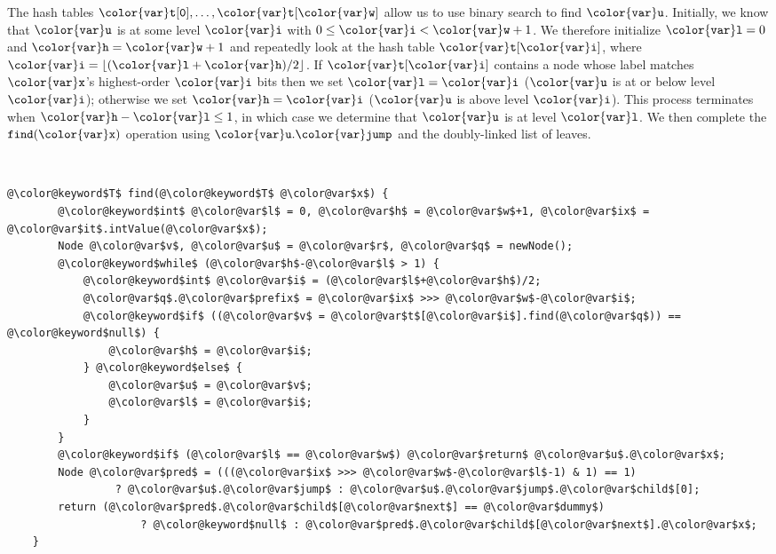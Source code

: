 \documentclass[10pt]{book}
\theoremstyle{plain}
\theoremstyle{definition}
\begin{document}
The hash tables $\ensuremath{\mathtt{{\color{var}t}[0]}},\ldots,\ensuremath{\mathtt{{\color{var}t}[{\color{var}w}]}}$ allow us to use binary search
to find \ensuremath{\mathtt{{\color{var}u}}}.  Initially, we know that \ensuremath{\mathtt{{\color{var}u}}} is at some level \ensuremath{\mathtt{{\color{var}i}}} with
$0\le \ensuremath{\mathtt{{\color{var}i}}}< \ensuremath{\mathtt{{\color{var}w}}}+1$. We therefore initialize $\ensuremath{\mathtt{{\color{var}l}}}=0$ and $\ensuremath{\mathtt{{\color{var}h}}}=\ensuremath{\mathtt{{\color{var}w}}}+1$
and repeatedly look at the hash table \ensuremath{\mathtt{{\color{var}t}[{\color{var}i}]}}, where $\ensuremath{\mathtt{{\color{var}i}}}=\lfloor
(\ensuremath{\mathtt{{\color{var}l}+{\color{var}h}}})/2\rfloor$.  If $\ensuremath{\mathtt{{\color{var}t}[{\color{var}i}]}}$ contains a node whose label matches
\ensuremath{\mathtt{{\color{var}x}}}'s highest-order \ensuremath{\mathtt{{\color{var}i}}} bits then we set \ensuremath{\mathtt{{\color{var}l}={\color{var}i}}} (\ensuremath{\mathtt{{\color{var}u}}} is at or below level
\ensuremath{\mathtt{{\color{var}i}}}); otherwise we set \ensuremath{\mathtt{{\color{var}h}={\color{var}i}}} (\ensuremath{\mathtt{{\color{var}u}}} is above level \ensuremath{\mathtt{{\color{var}i}}}).  This process
terminates when $\ensuremath{\mathtt{{\color{var}h}-{\color{var}l}}}\le 1$, in which case we determine that \ensuremath{\mathtt{{\color{var}u}}} is
at level \ensuremath{\mathtt{{\color{var}l}}}.  We then complete the \ensuremath{\mathtt{find({\color{var}x})}} operation using \ensuremath{\mathtt{{\color{var}u}.{\color{var}jump}}}
and the doubly-linked list of leaves.


 \ \vspace{.5ex}\begin{Verbatim}[gobble=1,tabsize=2,frame=single,framerule=1.2pt,commandchars=\\@\$,label=\texttt{XFastTrie},labelposition=topline]
	@\color@keyword$T$ find(@\color@keyword$T$ @\color@var$x$) {
		@\color@keyword$int$ @\color@var$l$ = 0, @\color@var$h$ = @\color@var$w$+1, @\color@var$ix$ = @\color@var$it$.intValue(@\color@var$x$);
		Node @\color@var$v$, @\color@var$u$ = @\color@var$r$, @\color@var$q$ = newNode();
		@\color@keyword$while$ (@\color@var$h$-@\color@var$l$ > 1) {
			@\color@keyword$int$ @\color@var$i$ = (@\color@var$l$+@\color@var$h$)/2;
			@\color@var$q$.@\color@var$prefix$ = @\color@var$ix$ >>> @\color@var$w$-@\color@var$i$;
			@\color@keyword$if$ ((@\color@var$v$ = @\color@var$t$[@\color@var$i$].find(@\color@var$q$)) == @\color@keyword$null$) {
				@\color@var$h$ = @\color@var$i$;
			} @\color@keyword$else$ {
				@\color@var$u$ = @\color@var$v$;
				@\color@var$l$ = @\color@var$i$;
			}
		}
		@\color@keyword$if$ (@\color@var$l$ == @\color@var$w$) @\color@var$return$ @\color@var$u$.@\color@var$x$;
		Node @\color@var$pred$ = (((@\color@var$ix$ >>> @\color@var$w$-@\color@var$l$-1) & 1) == 1) 
			     ? @\color@var$u$.@\color@var$jump$ : @\color@var$u$.@\color@var$jump$.@\color@var$child$[0];
		return (@\color@var$pred$.@\color@var$child$[@\color@var$next$] == @\color@var$dummy$) 
		             ? @\color@keyword$null$ : @\color@var$pred$.@\color@var$child$[@\color@var$next$].@\color@var$x$;
	}
\end{Verbatim}
\end{document}
